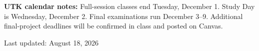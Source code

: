 \documentclass[11pt]{article}
\begin{document}
\textbf{UTK calendar notes:} Full-session classes end Tuesday, December 1. Study Day is Wednesday, December 2. Final examinations run December 3--9. Additional final-project deadlines will be confirmed in class and posted on Canvas.

\vfill
\begin{center}
\footnotesize Last updated: August 18, 2026
\end{center}
\end{document}
